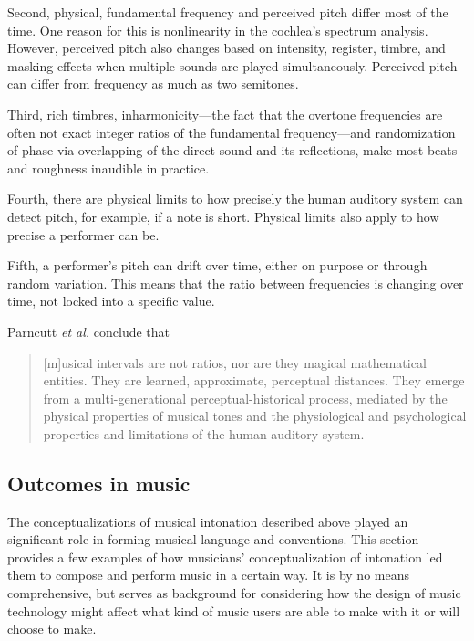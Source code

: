 Second, physical, fundamental frequency and perceived pitch differ most of the time. One reason for this is nonlinearity in the cochlea’s spectrum analysis. However, perceived pitch also changes based on intensity, register, timbre, and masking effects when multiple sounds are played simultaneously. Perceived pitch can differ from frequency as much as two semitones.

Third, rich timbres, inharmonicity---the fact that the overtone frequencies are often not exact integer ratios of the fundamental frequency---and randomization of phase via overlapping of the direct sound and its reflections, make most beats and roughness inaudible in practice.

Fourth, there are physical limits to how precisely the human auditory system can detect pitch, for example, if a note is short. Physical limits also apply to how precise a performer can be.

Fifth, a performer's pitch can drift over time, either on purpose or through random variation. This means that the ratio between frequencies is changing over time, not locked into a specific value.

Parncutt \textit{et al.} conclude that \begin{quotation}[m]usical intervals are not ratios, nor are they magical mathematical entities. They are learned, approximate, perceptual distances. They emerge from a multi-generational perceptual-historical process, mediated by the physical properties of musical tones and the physiological and psychological properties and limitations of the human auditory system.\end{quotation}
 
\subsection{Outcomes in music}
The conceptualizations of musical intonation described above played an significant role in forming musical language and conventions. This section provides a few examples of how musicians' conceptualization of intonation led them to compose and perform music in a certain way. It is by no means comprehensive, but serves as background for considering how the design of music technology might affect what kind of music users are able to make with it or will choose to make. 

